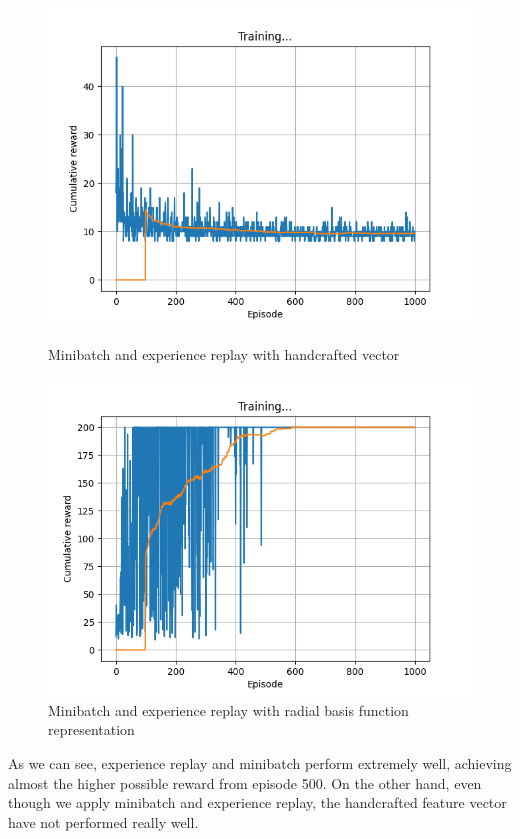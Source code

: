 \documentclass[12pt]{article}
\begin{document}
\begin{figure}[H]
    \centering
   \begin{minipage}{0.48\textwidth}
     \centering
     \includegraphics[width=0.9\linewidth]{exercise-4/plots/task-2a.png}
     \caption{Minibatch and experience replay with handcrafted vector}
     \label{fig:task-2-1}
   \end{minipage}\hfill
   \begin{minipage}{0.48\textwidth}
     \centering
     \includegraphics[width=0.9\linewidth]{exercise-4/plots/task-2b.png}
     \caption{Minibatch and experience replay with radial basis function representation}
     \label{fig:task-2-2}
   \end{minipage}
\end{figure}

As we can see, experience replay and minibatch perform extremely well, achieving almost the higher possible reward from episode 500. On the other hand, even though we apply minibatch and experience replay, the handcrafted feature vector have not performed really well.
\end{document}
